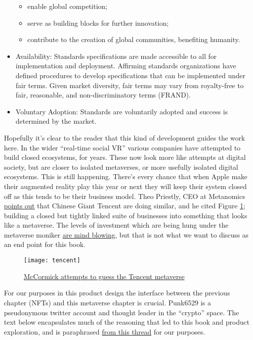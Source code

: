 \begin{itemize}
\begin{itemize}
\item enable global competition;
\item serve as building blocks for further innovation; 
\item contribute to the creation of global communities, benefiting humanity.
\end{itemize}
\item Availability: Standards specifications are made accessible to all for implementation and deployment. Affirming standards organizations have defined procedures to develop specifications that can be implemented under fair terms. Given market diversity, fair terms may vary from royalty-free to fair, reasonable, and non-discriminatory terms (FRAND).
\item Voluntary Adoption: Standards are voluntarily adopted and success is determined by the market.
\end{itemize}
Hopefully it's clear to the reader that this kind of development guides the work here. In the wider ``real-time social VR'' various companies have attempted to build closed ecosystems, for years. These now look more like attempts at digital society, but are closer to isolated metaverses, or more usefully isolated digital ecosystems. This is still happening. There's every chance that when Apple make their augmented reality play this year or next they will keep their system closed off as this tends to be their business model. Theo Priestly, CEO at Metanomics \href{https://www.linkedin.com/feed/update/urn:li:activity:6977366421034967040/}{points out} that Chinese Giant Tencent are doing similar, and he cited Figure \ref{fig:tencent}; building a closed but tightly linked suite of businesses into something that looks like a metaverse. The levels of investment which are being hung under the metaverse moniker \href{https://www.scmp.com/tech/policy/article/3194092/chinas-iphone-production-hub-henan-bets-its-future-metaverse}{are mind blowing}, but that is not what we want to discuss as an end point for this book.
\begin{figure}
  \centering
    \texttt{[image: tencent]}
  \caption{\href{https://www.notboring.co/p/tencents-dreams}{McCormick attempts to guess the Tencent metaverse}}
  \label{fig:tencent}
\end{figure}
For our purposes in this product design the interface between the previous chapter (NFTs) and this metaverse chapter is crucial. Punk6529 is a pseudonymous twitter account and thought leader in the ``crypto'' space. The text below encapsulates much of the reasoning that led to this book and product exploration, and is paraphrased \href{https://twitter.com/punk6529/status/1536046831045685248}{from this thread} for our purposes.\par
